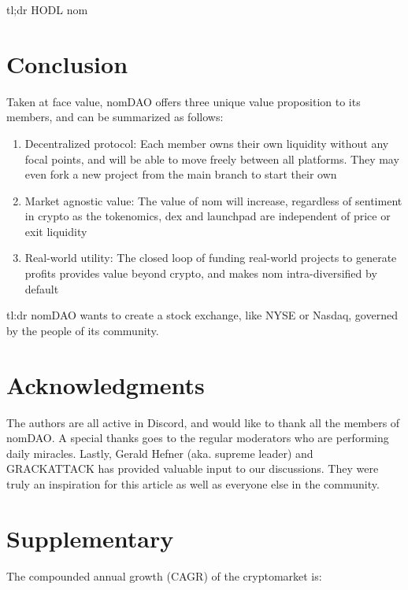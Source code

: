 \documentclass[12pt]{article}
\begin{document}
tl;dr HODL nom

\clearpage


\section*{Conclusion}

Taken at face value, nomDAO offers three unique value proposition to its members, and can be summarized as follows:

\begin{enumerate}

\item Decentralized protocol: Each member owns their own liquidity without any focal points, and will be able to move freely between all platforms. They may even fork a new project from the main branch to start their own

\item Market agnostic value: The value of nom will increase, regardless of sentiment in crypto as the tokenomics, dex and launchpad are independent of price or exit liquidity

\item Real-world utility: The closed loop of funding real-world projects to generate profits provides value beyond crypto, and makes nom intra-diversified by default

\end{enumerate}

tl:dr nomDAO wants to create a stock exchange, like NYSE or Nasdaq, governed by the people of its community.


\clearpage

\section*{Acknowledgments}
The authors are all active in Discord, and would like to thank all the members of nomDAO. A special thanks goes to the regular moderators who are performing daily miracles. Lastly, Gerald Hefner (aka. supreme leader) and GRACKATTACK has provided valuable input to our discussions. They were truly an inspiration for this article as well as everyone else in the community.








\clearpage

\section*{Supplementary}
The compounded annual growth (CAGR) of the cryptomarket is:
\end{document}
